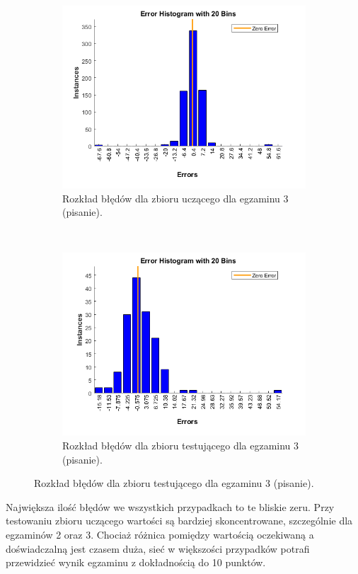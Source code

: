 \documentclass[12pt]{article}
\begin{document}
\begin{figure}[H]
\centering
\begin{subfigure}[t]{0.48\textwidth} 
\centering
\includegraphics[width=\textwidth]{hist_exam_3_learn.png}
\caption{Rozkład błędów dla zbioru uczącego dla egzaminu 3 (pisanie).}
\end{subfigure}
~~
\begin{subfigure}[t]{0.48\textwidth} 
\centering
\includegraphics[width=\textwidth]{hist_exam_3_test.png}
\caption{Rozkład błędów dla zbioru testującego dla egzaminu 3 (pisanie).}
\end{subfigure}
\end{figure}

Największa ilość błędów we wszystkich przypadkach to te bliskie zeru. Przy testowaniu zbioru uczącego wartości są bardziej skoncentrowane, szczególnie dla egzaminów 2 oraz 3. Chociaż różnica pomiędzy wartością oczekiwaną a doświadczalną jest czasem duża, sieć w większości przypadków potrafi przewidzieć wynik egzaminu z dokładnością do 10 punktów. 
\end{document}

